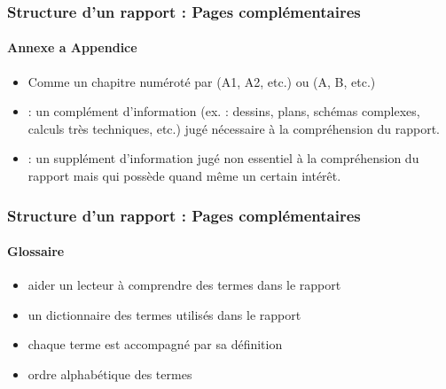 \documentclass[xcolor=table]{beamer}
\begin{document}
\begin{frame}
\frametitle{Structure d'un rapport : Pages complémentaires}
\framesubtitle{Annexe a Appendice}

\begin{minipage}{0.60\textwidth}
	
	\begin{itemize}
		\item Comme un chapitre numéroté par (A1, A2, etc.) ou (A, B, etc.)
		\item {} : un complément d'information (ex. : dessins, plans, schémas complexes, calculs très techniques, etc.) jugé nécessaire à la compréhension du rapport.
		\item {} : un supplément d'information jugé non essentiel à la compréhension du rapport mais qui possède quand même un certain intérêt.
	\end{itemize}
\end{minipage}
\begin{minipage}{0.38\textwidth}
\end{minipage}

\end{frame}

\begin{frame}
\frametitle{Structure d'un rapport : Pages complémentaires}
\framesubtitle{Glossaire}

\begin{minipage}{0.60\textwidth}
	\begin{itemize}
		\item aider un lecteur à comprendre des termes dans le rapport
		\item un dictionnaire des termes utilisés dans le rapport 
		\item chaque terme est accompagné par sa définition 
		\item ordre alphabétique des termes 
	\end{itemize}
\end{minipage}
\begin{minipage}{0.38\textwidth}
\end{minipage}

\end{frame}
\end{document}
